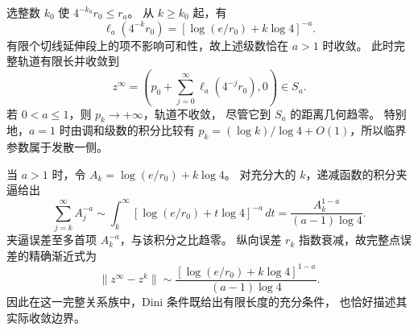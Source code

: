 选整数 $k_0$ 使 $4^{-k_0}r_0\le r_a$。
从 $k\ge k_0$ 起，有
\[
 \ell_a(4^{-k}r_0)=[\log(e/r_0)+k\log4]^{-a}.
\]
有限个切线延伸段上的项不影响可和性，故上述级数恰在 $a>1$ 时收敛。
此时完整轨道有限长并收敛到
\[
 z^\infty=\left(p_0+\sum_{j=0}^{\infty}\ell_a(4^{-j}r_0),0\right)\in S_a.
\]
若 $0<a\le1$，则 $p_k\to+\infty$，轨道不收敛，
尽管它到 $S_a$ 的距离几何趋零。
特别地，$a=1$ 时由调和级数的积分比较有
$p_k=(\log k)/\log4+O(1)$，所以临界参数属于发散一侧。

当 $a>1$ 时，令 $A_k=\log(e/r_0)+k\log4$。
对充分大的 $k$，递减函数的积分夹逼给出
\[
 \sum_{j=k}^{\infty}A_j^{-a}
 \sim\int_k^{\infty}[\log(e/r_0)+t\log4]^{-a}\,dt
 =\frac{A_k^{1-a}}{(a-1)\log4}.
\]
夹逼误差至多首项 $A_k^{-a}$，与该积分之比趋零。
纵向误差 $r_k$ 指数衰减，故完整点误差的精确渐近式为
\begin{equation}
\label{eq:log-exact-tail}
 \|z^\infty-z^k\|
 \sim\frac{[\log(e/r_0)+k\log4]^{1-a}}{(a-1)\log4}.
\end{equation}
因此在这一完整关系族中，Dini 条件既给出有限长度的充分条件，
也恰好描述其实际收敛边界。
